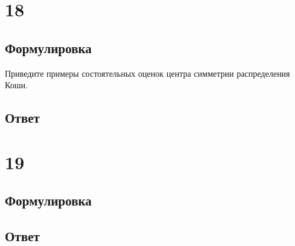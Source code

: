 \documentclass[a4]{article}
\begin{document}
	\section{18}
	\subsection*{Формулировка}
	Приведите примеры состоятельных оценок центра симметрии распределения Коши.
	\subsection*{Ответ}
	
	\section{19}
	\subsection*{Формулировка}
	
	\subsection*{Ответ}
\end{document}
